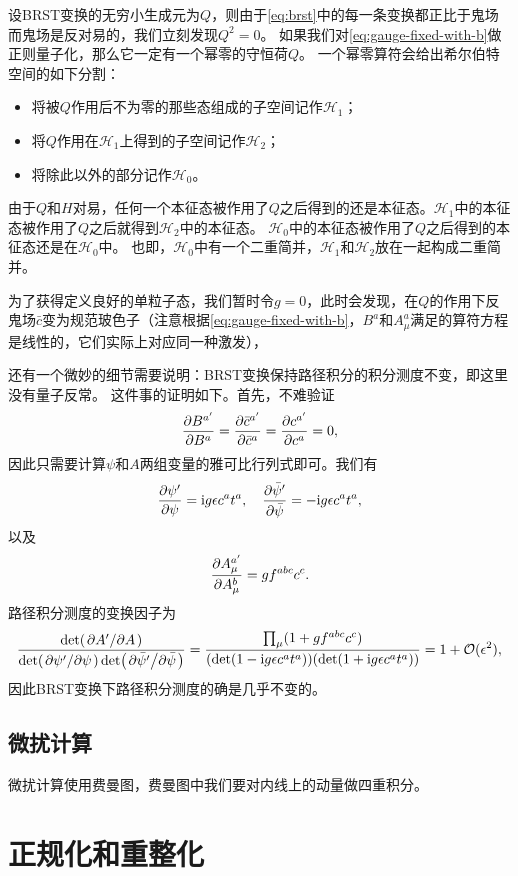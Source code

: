 \documentclass[hyperref, UTF8, a4paper]{ctexart}
\newcommand*{\ii}{\mathrm{i}}
\begin{document}
设BRST变换的无穷小生成元为$Q$，则由于\eqref{eq:brst}中的每一条变换都正比于鬼场而鬼场是反对易的，我们立刻发现$Q^2=0$。
如果我们对\eqref{eq:gauge-fixed-with-b}做正则量子化，那么它一定有一个幂零的守恒荷$Q$。
一个幂零算符会给出希尔伯特空间的如下分割：
\begin{itemize}
    \item 将被$Q$作用后不为零的那些态组成的子空间记作$\mathcal{H}_1$；
    \item 将$Q$作用在$\mathcal{H}_1$上得到的子空间记作$\mathcal{H}_2$；
    \item 将除此以外的部分记作$\mathcal{H}_0$。
\end{itemize}
由于$Q$和$H$对易，任何一个本征态被作用了$Q$之后得到的还是本征态。$\mathcal{H}_1$中的本征态被作用了$Q$之后就得到$\mathcal{H}_2$中的本征态。
$\mathcal{H}_0$中的本征态被作用了$Q$之后得到的本征态还是在$\mathcal{H}_0$中。
也即，$\mathcal{H}_0$中有一个二重简并，$\mathcal{H}_1$和$\mathcal{H}_2$放在一起构成二重简并。

为了获得定义良好的单粒子态，我们暂时令$g=0$，此时会发现，在$Q$的作用下反鬼场$\bar{c}$变为规范玻色子（注意根据\eqref{eq:gauge-fixed-with-b}，$B^a$和$A^a_\mu$满足的算符方程是线性的，它们实际上对应同一种激发），

还有一个微妙的细节需要说明：BRST变换保持路径积分的积分测度不变，即这里没有量子反常。
这件事的证明如下。首先，不难验证
\[
    \pdv{B^{a'}}{B^a} = \pdv{\bar{c}^{a'}}{\bar{c}^{a}} = \pdv{c^{a'}}{c^a} = 0,
\]
因此只需要计算$\psi$和$A$两组变量的雅可比行列式即可。我们有
\[
    \pdv{\psi'}{\psi} = \ii g \epsilon c^a t^a, \quad \pdv{\bar{\psi}'}{\bar{\psi}} = - \ii g \epsilon c^a t^a,
\]
以及
\[
    \pdv{A^{a'}_\mu}{A^b_\mu} = g f^{abc} c^c.
\]
路径积分测度的变换因子为
\[
    \frac{\det (\pdv*{A'}{A})}{\det (\pdv*{\psi'}{\psi}) \det (\pdv*{\bar{\psi}'}{\bar{\psi}})} = \frac{\prod_\mu (1 + g f^{abc} c^c)}{(\det (1 - \ii g \epsilon c^a t^a)) (\det (1 + \ii g \epsilon c^a t^a))} = 1 + \mathcal{O}(\epsilon^2),
\]
因此BRST变换下路径积分测度的确是几乎不变的。

\subsection{微扰计算}

微扰计算使用费曼图，费曼图中我们要对内线上的动量做四重积分。

\section{正规化和重整化}
\end{document}
